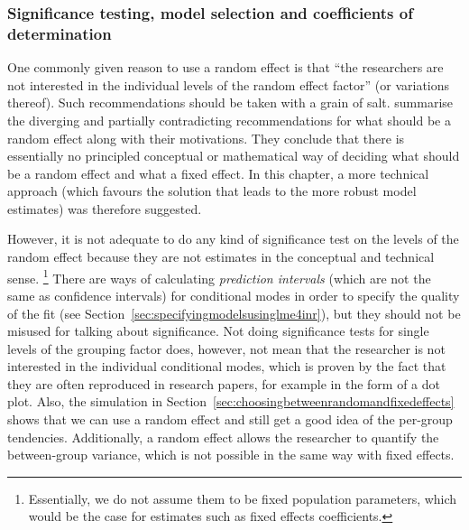 \documentclass[a4paper,12pt]{article}
\begin{document}
\subsubsection{Significance testing, model selection and coefficients of determination}
\label{sec:significancetestingandcoefficientsofdetermination}

One commonly given reason to use a random effect is that ``the researchers are not interested in the individual levels of the random effect factor'' (or variations thereof).
Such recommendations should be taken with a grain of salt.
\citet[245--247]{GelmanHill2006} summarise the diverging and partially contradicting recommendations for what should be a random effect along with their motivations.
They conclude that there is essentially no principled conceptual or mathematical way of deciding what should be a random effect and what a fixed effect.
In this chapter, a more technical approach (which favours the solution that leads to the more robust model estimates) was therefore suggested.

However, it is not adequate to do any kind of significance test on the levels of the random effect because they are not estimates in the conceptual and technical sense.%
\footnote{Essentially, we do not assume them to be fixed population parameters, which would be the case for estimates such as fixed effects coefficients.}
There are ways of calculating \textit{prediction intervals} (which are not the same as confidence intervals) for conditional modes in order to specify the quality of the fit (see Section~\ref{sec:specifyingmodelsusinglme4inr}), but they should not be misused for talking about significance.
Not doing significance tests for single levels of the grouping factor does, however, not mean that the researcher is not interested in the individual conditional modes, which is proven by the fact that they are often reproduced in research papers, for example in the form of a dot plot.
Also, the simulation in Section~\ref{sec:choosingbetweenrandomandfixedeffects} shows that we can use a random effect and still get a good idea of the per-group tendencies.
Additionally, a random effect allows the researcher to quantify the between-group variance, which is not possible in the same way with fixed effects.
\end{document}
